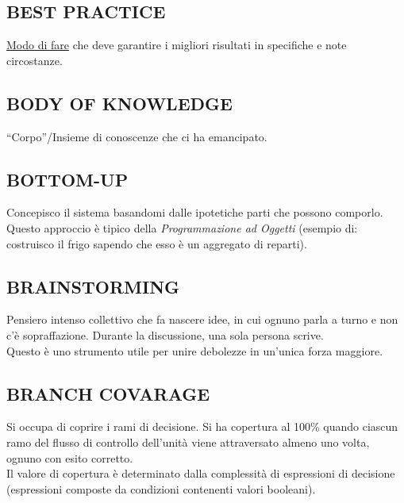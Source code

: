 		\subsection{BEST PRACTICE}  \label{best}
		\underline{\hyperref[way]{Modo di fare}} che deve garantire i migliori risultati in specifiche e note circostanze.


		\subsection{BODY OF KNOWLEDGE}  \label{body}
		``Corpo''/Insieme di conoscenze che ci ha emancipato.


		\subsection{BOTTOM-UP} \label{bottomup}
		Concepisco il sistema basandomi dalle ipotetiche parti che possono comporlo. Questo approccio è tipico della \textit{Programmazione ad Oggetti} (esempio di: costruisco il frigo sapendo che esso è un aggregato di reparti).


		\subsection{BRAINSTORMING}  \label{brainstorming}
		Pensiero intenso collettivo che fa nascere idee, in cui ognuno parla a turno e non c'è sopraffazione. Durante la discussione, una sola persona scrive. \\
		Questo è uno strumento utile per unire debolezze in un'unica forza maggiore.


		\subsection{BRANCH COVARAGE}		\label{branchcoverage}
		Si occupa di coprire i rami di decisione. Si ha copertura al 100\% quando ciascun ramo del flusso di controllo dell'unità viene attraversato almeno uno volta, ognuno con esito corretto. \\
		Il valore di copertura è determinato dalla complessità di espressioni di decisione (espressioni composte da condizioni contenenti valori booleani).
